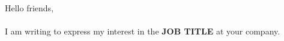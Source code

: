 \documentclass[final, hidelinks, 12pt, a4paper]{article}
\begin{document}
    \begin{titlepage}
        \noindent Hello friends,\\\\
        I am writing to express my interest in the {\bfseries JOB TITLE} at your company.       
    \end{titlepage} 
\end{document}
